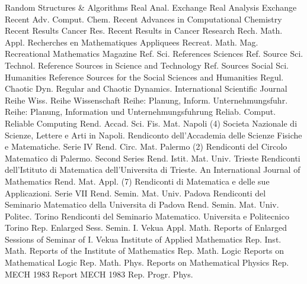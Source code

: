 {Random Structures & Algorithms}
{Real Anal. Exchange}
{Real Analysis Exchange}
{Recent Adv. Comput. Chem.}
{Recent Advances in Computational Chemistry}
{Recent Results Cancer Res.}
{Recent Results in Cancer Research}
{Rech. Math. Appl.}
{Recherches en Mathematiques Appliquees}
{Recreat. Math. Mag.}
{Recreational Mathematics Magazine}
{Ref. Sci.}
{References Sciences}
{Ref. Source Sci. Technol.}
{Reference Sources in Science and Technology}
{Ref. Sources Social Sci. Humanities}
{Reference Sources for the Social Sciences and Humanities}
{Regul. Chaotic Dyn.}
{Regular and Chaotic Dynamics. International Scientific Journal}
{Reihe Wiss.}
{Reihe Wissenschaft}
{Reihe: Planung, Inform. Unternehmungsfuhr.}
{Reihe: Planung, Information und Unternehmungsfuhrung}
{Reliab. Comput.}
{Reliable Computing}
{Rend. Accad. Sci. Fis. Mat. Napoli (4)}
{Societa Nazionale di Scienze, Lettere e Arti in Napoli. Rendiconto dell'Accademia delle Scienze Fisiche e Matematiche. Serie IV}
{Rend. Circ. Mat. Palermo (2)}
{Rendiconti del Circolo Matematico di Palermo. Second Series}
{Rend. Istit. Mat. Univ. Trieste}
{Rendiconti dell'Istituto di Matematica dell'Universita di Trieste. An International Journal of Mathematics}
{Rend. Mat. Appl. (7)}
{Rendiconti di Matematica e delle sue Applicazioni. Serie VII}
{Rend. Semin. Mat. Univ. Padova}
{Rendiconti del Seminario Matematico della Universita di Padova}
{Rend. Semin. Mat. Univ. Politec. Torino}
{Rendiconti del Seminario Matematico. Universita e Politecnico Torino}
{Rep. Enlarged Sess. Semin. I. Vekua Appl. Math.}
{Reports of Enlarged Sessions of Seminar of I. Vekua Institute of Applied Mathematics}
{Rep. Inst. Math.}
{Reports of the Institute of Mathematics}
{Rep. Math. Logic}
{Reports on Mathematical Logic}
{Rep. Math. Phys.}
{Reports on Mathematical Physics}
{Rep. MECH 1983}
{Report MECH 1983}
{Rep. Progr. Phys.}
